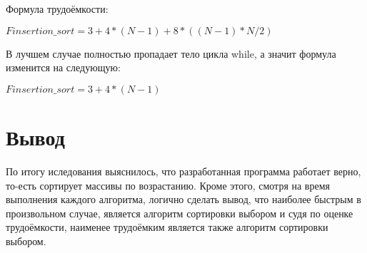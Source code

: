 Формула трудоёмкости:

$Finsertion\_sort = 3 + 4*(N-1) + 8*((N-1)*N/2)$

В лучшем случае полностью пропадает тело цикла while, а значит формула изменится на следующую:

$Finsertion\_sort = 3 + 4*(N-1)$

\section{Вывод}
По итогу иследования выяснилось, что разработанная программа работает верно, то-есть сортирует массивы по возрастанию. Кроме этого, смотря на время выполнения каждого алгоритма, логично сделать вывод, что наиболее быстрым в произвольном случае, является алгоритм сортировки выбором и судя по оценке трудоёмкости, наименее трудоёмким является также алгоритм сортировки выбором.